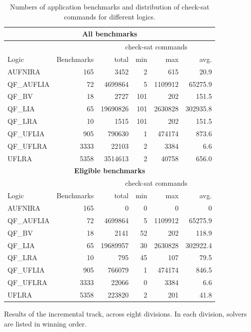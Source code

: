 \documentclass[twoside,11pt]{article}
\begin{document}
\begin{table}
\centering
\begin{tabular}{|l|r|rrrr|}
\multicolumn{6}{c}{\textbf{All benchmarks}} \\
\hline
&  & \multicolumn{4}{c|}{check-sat commands} \\
 Logic & Benchmarks & total & min & max & avg. \\
\hline
AUFNIRA & 165  & 3452 & 2 & 615 & 20.9 \\
QF\_AUFLIA & 72 & 4699864 & 5 & 1109912 & 65275.9 \\
QF\_BV & 18 & 2727 & 101 & 202 & 151.5 \\
QF\_LIA & 65 & 19690826 & 101 & 2630828 & 302935.8 \\
QF\_LRA & 10 & 1515 & 101 & 202 & 151.5 \\
QF\_UFLIA & 905 & 790630 & 1 & 474174 & 873.6 \\
QF\_UFLRA & 3333 & 22103 & 2 & 3384 & 6.6 \\
UFLRA & 5358 & 3514613 & 2 & 40758 & 656.0 \\
\hline
\multicolumn{6}{c}{\textbf{Eligible benchmarks}} \\
\hline
&  & \multicolumn{4}{c|}{check-sat commands} \\
 Logic & Benchmarks & total & min & max & avg. \\
\hline
AUFNIRA & 165  & 0 & 0 & 0 & 0 \\
QF\_AUFLIA & 72 & 4699864 & 5 & 1109912 & 65275.9 \\
QF\_BV & 18 & 2141 & 52 & 202 & 118.9 \\
QF\_LIA & 65 & 19689957 & 30 & 2630828 & 302922.4 \\
QF\_LRA & 10 & 795 & 45 & 107 & 79.5 \\
QF\_UFLIA & 905 & 766079 & 1 & 474174 & 846.5 \\
QF\_UFLRA & 3333 & 22066 & 0 & 3384 & 6.6 \\
UFLRA & 5358 & 223820 & 2 & 201 & 41.8 \\
\hline
\end{tabular}
\caption{Numbers of application benchmarks and distribution of check-sat commands for different logics.}
\label{Fig:apptrack-benchmarks}
\end{table}
 

\begin{table}
\centering

\caption{Results of the incremental track, across eight divisions. In each division, solvers are listed in winning order.}
\label{Fig:apptrack-results}
\end{table}
\end{document}
